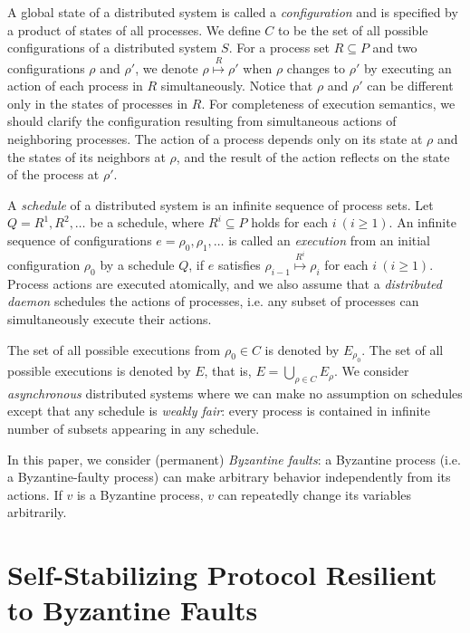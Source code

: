 \documentclass[11pt]{article}
\begin{document}
A global state of a distributed system is called a \emph{configuration}
and is specified by a product of states of all processes.
We define $C$ to be the set of all possible configurations
of a distributed system $S$.
For a process set $R \subseteq P$ and two configurations $\rho$ and $\rho'$,
we denote $\rho \stackrel{R}{\mapsto} \rho'$
when $\rho$ changes to $\rho'$ by executing an action of each process
in $R$ simultaneously.
Notice that $\rho$ and $\rho'$ can be different only in
the states of processes in $R$.
For completeness of execution semantics, we should clarify
the configuration resulting from simultaneous actions of
neighboring processes.
The action of a process depends only on its state
at $\rho$ and the states of its neighbors at $\rho$,
and the result of the action reflects on the state of the process
at $\rho '$.

A \emph{schedule} of a distributed system is an infinite sequence of
process sets.  Let $Q=R^1, R^2, \ldots$  be a schedule,
where $R^i \subseteq P$ holds for each $i\ (i \ge 1)$.
An infinite sequence of configurations
$e=\rho_0,\rho_1,\ldots$ is called an \emph{execution} from
an initial configuration $\rho_0$ by a schedule $Q$,
if $e$ satisfies $\rho_{i-1} \stackrel{R^i}{\mapsto} \rho_i$
for each $i\ (i \ge 1)$.
Process actions are executed atomically, and we also assume
that a \emph{distributed daemon} schedules the actions of processes,
i.e. any subset of processes can simultaneously execute
their actions.

The set of all possible executions from
$\rho_0\in C$ is denoted by $E_{\rho_0}$.
The set of all possible executions is denoted by $E$, that is,
$E=\bigcup_{\rho\in C}E_{\rho}$.
We consider \emph{asynchronous} distributed systems
where we can make no assumption
on schedules except that any schedule is \emph{weakly fair}:
every process is contained in infinite number of subsets
appearing in any schedule.

In this paper, we consider (permanent) \emph{Byzantine faults}:
a Byzantine process (i.e. a Byzantine-faulty process)
can make arbitrary behavior independently from its actions.
If $v$ is a Byzantine process,
$v$ can repeatedly change its variables arbitrarily.

\section{Self-Stabilizing Protocol Resilient to Byzantine Faults}\label{sec:stab}
\end{document}
